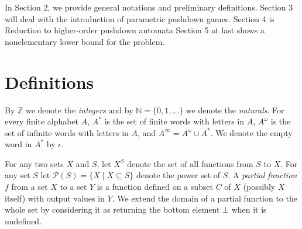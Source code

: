 \documentclass[a4paper,UKenglish,cleveref, autoref, thm-restate]{lipics-v2021}
\newcommand{\Z}{\mathbb{Z}}
\newcommand{\N}{\mathbb{N}}
\newcommand{\MSO}{\textsc{MSO}}
\begin{document}
In Section 2, we provide general notations and preliminary definitions. 
Section 3 will deal with the introduction of  parametric pushdown games.
Section 4 is Reduction to higher-order pushdown automata
Section 5 at last shows a nonelementary lower bound for the problem.




\section{Definitions}


\newcommand{\LCM}{\mathsf{LCM}}
\newcommand{\LOGSPACE}{\mathsf{LOGSPACE}}
\renewcommand{\MSO}{\mathsf{MSO}}
\newcommand{\SO}{\mathsf{SO}}

By $\Z $ we denote the {\em integers} and by $\N=\{0,1,\ldots\}$ we denote the {\em naturals}.
For every finite alphabet $A$, $A^*$ is the set of finite
words with letters in  $A$, $A^\omega$ is the set of infinite words with letters in $A$, and
 $A^\infty = A^\omega \cup A^*$. We denote the empty word in $A^*$ by $\epsilon$.
%

 For any two sets $X$ and $S$, let $X^S$ denote the set of all functions from $S$ to $X$.
For any set $S$ let 
$\mathcal{P}(S) = \{ X \mid X \subseteq S \}$
denote the power set of $S$.
%
A {\em partial function} $f$ from a set $X$ to a set $Y$ is a function defined on a subset $C$ of $X$ (possibly $X$ itself) with output values in $Y$. We extend the domain of a partial function to the whole set
by considering it as returning the bottom element $\bot$ when it is undefined.
\end{document}
